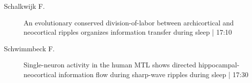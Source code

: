\begin{symposium}
\begin{description}
                \item [ Schalkwijk F.] An evolutionary conserved division-of-labor between archicortical and neocortical ripples organizes information transfer during sleep \textcolor{mygray}{ | 17:10}    
                
                \item [ Schwimmbeck F.] Single-neuron activity in the human MTL shows directed hippocampal-neocortical information flow during sharp-wave ripples during sleep \textcolor{mygray}{ | 17:30}    
                
            \end{description} 
            \end{symposium}
            